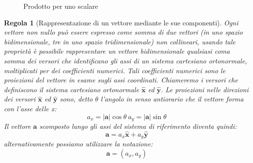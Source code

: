 \documentclass[a4paper,10pt,oneside]{article}
\newtheorem{regola}{Regola}
\begin{document}
\begin{figure}[H]
\centering
\caption{Prodotto per uno scalare}
\end{figure}
\begin{regola} [Rappresentazione di un vettore mediante le sue componenti]
 Ogni vettore non nullo può essere espresso come somma di due vettori (in uno spazio bidimensionale, tre in uno spazio tridimensionale) non collineari, usando tale proprietà è possibile rappresentare un vettore bidimensionale qualsiasi coma somma dei versori che identificano gli assi di un sistema cartesiano ortonormale, moltiplicati per dei coefficienti numerici. Tali coefficienti numerici sono le proiezioni del vettore in esame sugli assi coordinati. Chiameremo i versori che definiscono il sistema cartesiano ortonormale  $\hat{\mathbf{x}}$ ed $\hat{\mathbf{y}}$. Le proiezioni nelle direzioni dei versori $\hat{\mathbf{x}}$ ed $\hat{\mathbf{y}}$ sono, detto $\theta$ l'angolo in senso antiorario che il vettore forma con l'asse delle x:
\begin{equation*}
 a_x=|\mathbf{a}|\cos\theta\ a_y=|\mathbf{a}|\sin\theta
\end{equation*}
Il vettore $\mathbf{a}$ scomposto lungo gli assi del sistema di riferimento diventa quindi:
\begin{equation*}
 \mathbf{a}=a_x\hat{\mathbf{x}}+a_y\hat{\mathbf{y}}
\end{equation*}
alternativamente possiamo utilizzare la notazione:
\begin{equation*}
 \mathbf{a}=(a_x,a_y)
\end{equation*}
\end{regola}
\end{document}
